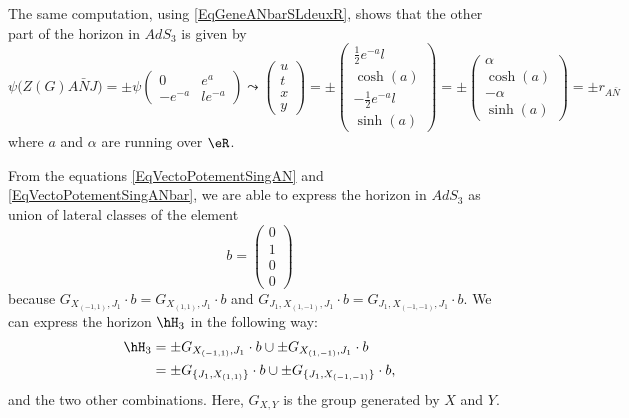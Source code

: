 The same computation, using \eqref{EqGeneANbarSLdeuxR}, shows that the other part of the horizon in $AdS_3$ is given by
\begin{equation}		\label{EqVectoPotementSingANbar}
\psi\big( Z(G)A\bar NJ\big)
=
\pm\psi
\begin{pmatrix}
	0	&	e^a	\\
	- e^{-a}	&	l e^{-a}
\end{pmatrix}
\leadsto
\begin{pmatrix}
	u	\\
	t	\\
	x	\\
	y
\end{pmatrix}=
\pm
\begin{pmatrix}
	\frac{1}{ 2 } e^{-a}l	\\
	\cosh(a)	\\
	-\frac{1}{ 2 } e^{-a}l	\\
	\sinh(a)
\end{pmatrix}
=
\pm
\begin{pmatrix}
	\alpha	\\
	\cosh(a)	\\
	-\alpha	\\
	\sinh(a)
\end{pmatrix}
=\pm
r_{A\bar N}
\end{equation}
where $a$ and $\alpha$ are running over $\eR$.

From the equations \eqref{EqVectoPotementSingAN} and \eqref{EqVectoPotementSingANbar}, we are able to express the horizon in $AdS_3$ as union of lateral classes of the element
\begin{equation}
	b=\begin{pmatrix}
		0	\\
		1	\\
		0	\\
		0
	\end{pmatrix}
\end{equation}
because $G_{ X_{(-1,1)},J_1}\cdot b =G_{ X_{(1,1)},J_1}\cdot b$ and $G_{ J_1,X_{(1,-1)},J_1}\cdot b=G_{ J_1,X_{(-1,-1)} ,J_1}\cdot b$. We can express the horizon $\hH_3$ in the following way:
\begin{equation}
	\begin{aligned}[]
		\hH_3	&=\pm G_{ X_{(-1,1)},J_1}\cdot b\cup \pm G_{ X_{(1,-1)},J_1}\cdot b  \\
			&=\pm G_{ \{J_1,X_{(1,1)}\}}\cdot b\cup \pm G_{ \{J_1,X_{(-1,-1)}\}}\cdot b,
	\end{aligned}
\end{equation}
and the two other combinations. Here, $G_{X,Y}$ is the group generated by $X$ and $Y$.

